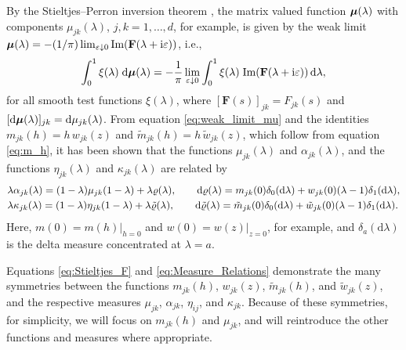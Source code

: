 \documentclass{cmslatex}
\newcommand{\I}{\mathrm{i}}
\renewcommand{\d}{\text{d}}
\newcommand\bmu{\mbox{\boldmath${\mu}$}}
\begin{document}
By the Stieltjes--Perron inversion theorem
\cite{Henrici:1974:v2,MILTON:2002:TC}, the matrix valued function
$\bmu(\lambda)$ with components $\mu_{jk}(\lambda)$, $j,k=1,\ldots,d$, for example, is
given by the weak limit  
$\bmu(\lambda)=-(1/\pi)\lim_{\varepsilon\downarrow0}\text{Im}(\mathbf{F}(\lambda+\I\varepsilon))$, i.e., 
%
\begin{align}\label{eq:weak_limit_mu}
  \int_0^1\xi(\lambda)\;\d\bmu(\lambda)
  =-\frac{1}{\pi}\lim_{\varepsilon\downarrow0}
        \int_0^1\xi(\lambda)\;\text{Im}(\mathbf{F}(\lambda+\I\varepsilon))\, \d\lambda,
\end{align}
%
for all smooth test functions $\xi(\lambda)$, where
$[\mathbf{F}(s)]_{jk}=F_{jk}(s)$ and
$[\d\bmu(\lambda)]_{jk}=\d\mu_{jk}(\lambda)$. From equation 
\eqref{eq:weak_limit_mu} and the identities 
$m_{jk}(h)=h\,w_{jk}(z)$ and $\tilde{m}_{jk}(h)=h\,\tilde{w}_{jk}(z)$,
which follow from equation \eqref{eq:m_h}, it has been
shown \cite{Murphy:JMP:063506} that the functions $\mu_{jk}(\lambda)$ and
$\alpha_{jk}(\lambda)$, and the functions $\eta_{jk}(\lambda)$ and $\kappa_{jk}(\lambda)$ are
related by
%
\begin{align}\label{eq:Measure_Relations}
  &\lambda\alpha_{jk}(\lambda)=(1-\lambda)\mu_{jk}(1-\lambda)+\lambda\varrho(\lambda), \qquad
  \d\varrho(\lambda)=m_{jk}(0)\delta_0(\d\lambda)+w_{jk}(0)(\lambda-1)\delta_1(\d\lambda),
  \notag     \\
  &\lambda\kappa_{jk}(\lambda)=(1-\lambda)\eta_{jk}(1-\lambda)+\lambda\tilde{\varrho}(\lambda), \qquad
  \d\tilde{\varrho}(\lambda)=\tilde{m}_{jk}(0)\delta_0(\d\lambda)+\tilde{w}_{jk}(0)(\lambda-1)\delta_1(\d\lambda).  
\end{align}
%
Here, $m(0)=m(h)|_{h=0}$ and $w(0)=w(z)|_{z=0}$, for example, and
$\delta_a(\d\lambda)$ is the delta measure concentrated at $\lambda=a$.



Equations
\eqref{eq:Stieltjes_F} and \eqref{eq:Measure_Relations} demonstrate
the many symmetries between 
the functions $m_{jk}(h)$, $w_{jk}(z)$, $\tilde{m}_{jk}(h)$, and
$\tilde{w}_{jk}(z)$, and the respective measures $\mu_{jk}$, $\alpha_{jk}$,
$\eta_{ij}$, and $\kappa_{jk}$. Because of these symmetries, for simplicity,
we will focus on $m_{jk}(h)$ and $\mu_{jk}$, and will reintroduce the
other functions and measures where appropriate.  
\end{document}
